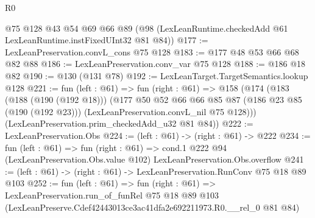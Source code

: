 \begin{lexlean}{R0}
\begin{coremodule}
    @75
    @128
    @43
    @54
    @69
    @66
    @89
    (@98 (LexLeanRuntime.checkedAdd @61 LexLeanRuntime.instFixedUInt32 @81 @84))
@177 := LexLeanPreservation.convL_cons @75 @128
@183 := @177 @48 @53 @66 @68 @82 @88
@186 := LexLeanPreservation.conv_var @75 @128
@188 := @186 @18 @82
@190 := @130 (@131 @78)
@192 := LexLeanTarget.TargetSemantics.lookup @128
@221 := fun (left : @61) =>
  fun (right : @61) =>
  @158
    (@174
      (@183
        (@188 (@190 (@192 @18)))
        (@177
          @50
          @52
          @66
          @66
          @85
          @87
          (@186 @23 @85 (@190 (@192 @23)))
          (LexLeanPreservation.convL_nil @75 @128)))
      (LexLeanPreservation.prim_checkedAdd_u32 @81 @84))
@222 := LexLeanPreservation.Obs
@224 := (left : @61) -> (right : @61) -> @222
@234 := fun (left : @61) =>
  fun (right : @61) =>
  cond.{1} @222 @94 (LexLeanPreservation.Obs.value @102) LexLeanPreservation.Obs.overflow
@241 := (left : @61) -> (right : @61) -> LexLeanPreservation.RunConv @75 @18 @89 @103
@252 := fun (left : @61) =>
  fun (right : @61) =>
  LexLeanPreservation.run_of_funRel
    @75
    @18
    @89
    @103
    (LexLeanPreserve.Cdef42443013ce3ac41dfa2e692211973.R0.__rel_0 @81 @84)
\end{coremodule}
\end{lexlean}
